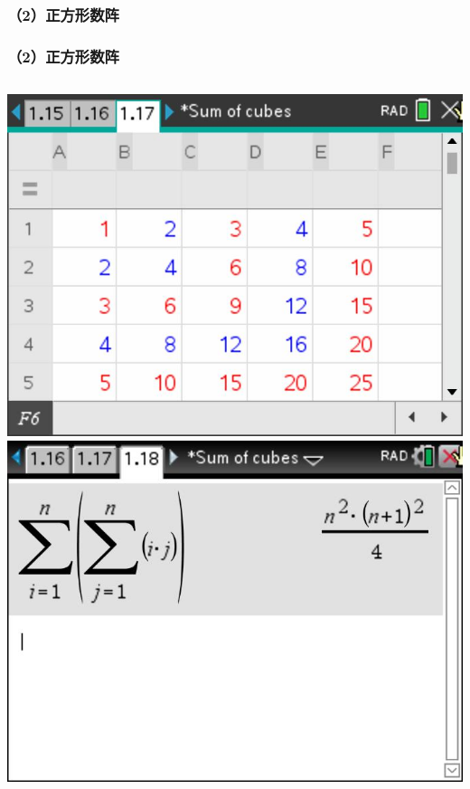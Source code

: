 \documentclass[aspectratio=169]{beamer}
\begin{document}
\subsubsection{（2）正方形数阵}
        \begin{frame}
       \frametitle{（2）正方形数阵}
       \begin{columns}
       	\includegraphics[scale=0.255]{正方形数阵.jpg}
       	\vspace{2cm}
       	\includegraphics[scale=0.3]{正方形数阵和式.jpg}
       	\vspace{2cm}
       \end{columns}      
   \end{frame}
\end{document}
